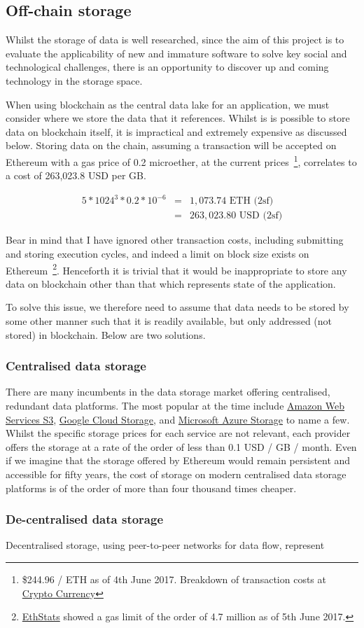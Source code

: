 \subsection{Off-chain storage}

Whilst the storage of data is well researched, since the aim of this project is to evaluate the applicability of new and immature software to solve key social and technological challenges, there is an opportunity to discover up and coming technology in the storage space.

When using blockchain as the central data lake for an application, we must consider where we store the data that it references. Whilst is is possible to store data on blockchain itself, it is impractical and extremely expensive as discussed below. Storing data on the chain, assuming a transaction will be accepted on Ethereum with a gas price of 0.2 microether, at the current prices~\footnote{\$244.96 / ETH as of 4th June 2017. Breakdown of transaction costs at \href{https://www.cryptocompare.com/coins/guides/what-is-the-gas-in-ethereum/}{Crypto Currency}}, correlates to a cost of 263,023.8 USD per GB.

$$
\begin{aligned}
5 * 1024^{3} * 0.2 * 10^{-6} &=& 1,073.74 \text{ ETH (2sf)} \\
&=& 263,023.80 \text{ USD (2sf)}
\end{aligned}
$$

Bear in mind that I have ignored other transaction costs, including submitting and storing execution cycles, and indeed a limit on block size exists on Ethereum~\footnote{\href{https://ethstats.net/}{EthStats} showed a gas limit of the order of 4.7 million as of 5th June 2017.}. Henceforth it is trivial that it would be inappropriate to store any data on blockchain other than that which represents state of the application.

To solve this issue, we therefore need to assume that data needs to be stored by some other manner such that it is readily available, but only addressed (not stored) in blockchain. Below are two solutions.

\subsubsection{Centralised data storage}

There are many incumbents in the data storage market offering centralised, redundant data platforms. The most popular at the time include \href{https://aws.amazon.com/s3/}{Amazon Web Services S3}, \href{https://cloud.google.com/storage/}{Google Cloud Storage}, and \href{https://azure.microsoft.com/en-gb/services/storage/}{Microsoft Azure Storage} to name a few. Whilst the specific storage prices for each service are not relevant, each provider offers the storage at a rate of the order of less than 0.1 USD / GB / month. Even if we imagine that the storage offered by Ethereum would remain persistent and accessible for fifty years, the cost of storage on modern centralised data storage platforms is of the order of more than four thousand times cheaper.

\subsubsection{De-centralised data storage}

Decentralised storage, using peer-to-peer networks for data flow, represent 
